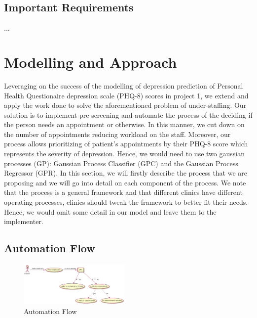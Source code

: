 \documentclass{article}
\begin{document}
	\subsection{Important Requirements}
	...
	
	\section{Modelling and Approach}
	Leveraging on the success of the modelling of depression prediction of Personal Health Questionaire depression scale (PHQ-8) scores in project 1, we extend and apply the work done to solve the aforementioned problem of under-staffing.
	Our solution is to implement pre-screening and automate the process of the deciding if the person needs an appointment or otherwise.
	In this manner, we cut down on the number of appointments reducing workload on the staff. 
	Moreover, our process allows prioritizing of patient's appointments by their PHQ-8 score which represents the severity of depression.
	Hence, we would need to use two gaussian processes (GP): Gaussian Process Classifier (GPC) and the Gaussian Process Regressor (GPR). 
	In this section, we will firstly describe the process that we are proposing and we will go into detail on each component of the process. 
	We note that the process is a general framework and that different clinics have different operating processes, clinics should tweak the framework to better fit their needs. 
	Hence, we would omit some detail in our model and leave them to the implementer.

	\subsection{Automation Flow} \label{af}
	\begin{figure}[h]
 		\begin{center}
		\includegraphics[width=0.48\textwidth]{automation} 
  		\end{center}
  		\caption{Automation Flow}
  		\label{auto_flow} 
 	\end{figure}

\end{document}

